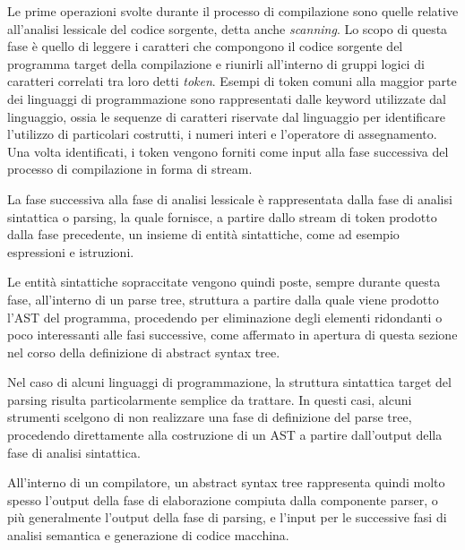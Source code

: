 Le prime operazioni svolte durante il processo di compilazione sono quelle
relative all’analisi lessicale del codice sorgente, detta anche
\textit{scanning}. Lo scopo di questa fase è quello di leggere i caratteri che
compongono il codice sorgente del programma target della compilazione e riunirli
all’interno di gruppi logici di caratteri correlati tra loro detti
\textit{token}. Esempi di token comuni alla maggior parte dei linguaggi di
programmazione sono rappresentati dalle keyword utilizzate dal linguaggio, ossia
le sequenze di caratteri riservate dal linguaggio per identificare l'utilizzo di
particolari costrutti, i numeri interi e l’operatore di assegnamento. Una volta
identificati, i token vengono forniti come input alla fase successiva del
processo di compilazione in forma di stream.

La fase successiva alla fase di analisi lessicale è rappresentata dalla fase di
analisi sintattica o parsing, la quale fornisce, a partire dallo stream di token
prodotto dalla fase precedente, un insieme di entità sintattiche, come ad
esempio espressioni e istruzioni.

Le entità sintattiche sopraccitate vengono quindi poste, sempre durante questa
fase, all’interno di un parse tree, struttura a partire dalla quale viene
prodotto l’AST del programma, procedendo per eliminazione degli elementi
ridondanti o poco interessanti alle fasi successive, come affermato in apertura
di questa sezione nel corso della definizione di abstract syntax tree.

Nel caso di alcuni linguaggi di programmazione, la struttura sintattica target
del parsing risulta particolarmente semplice da trattare. In questi casi, alcuni
strumenti scelgono di non realizzare una fase di definizione del parse tree,
procedendo direttamente alla costruzione di un AST a partire dall’output della
fase di analisi sintattica.

All’interno di un compilatore, un abstract syntax tree rappresenta quindi molto
spesso l’output della fase di elaborazione compiuta dalla componente parser, o
più generalmente l’output della fase di parsing, e l’input per le successive
fasi di analisi semantica e generazione di codice macchina.

